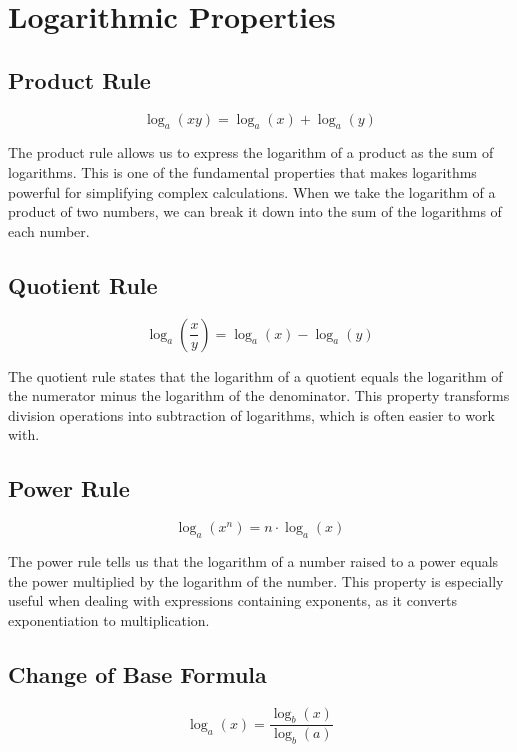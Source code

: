\documentclass{article}
\begin{document}
\section*{Logarithmic Properties}

\subsection*{Product Rule}
\begin{equation}
\log_a(xy) = \log_a(x) + \log_a(y)
\end{equation}

The product rule allows us to express the logarithm of a product as the sum of logarithms. This is one of the fundamental properties that makes logarithms powerful for simplifying complex calculations. When we take the logarithm of a product of two numbers, we can break it down into the sum of the logarithms of each number.

\subsection*{Quotient Rule}
\begin{equation}
\log_a\left(\frac{x}{y}\right) = \log_a(x) - \log_a(y)
\end{equation}

The quotient rule states that the logarithm of a quotient equals the logarithm of the numerator minus the logarithm of the denominator. This property transforms division operations into subtraction of logarithms, which is often easier to work with.

\subsection*{Power Rule}
\begin{equation}
\log_a(x^n) = n \cdot \log_a(x)
\end{equation}

The power rule tells us that the logarithm of a number raised to a power equals the power multiplied by the logarithm of the number. This property is especially useful when dealing with expressions containing exponents, as it converts exponentiation to multiplication.

\subsection*{Change of Base Formula}
\begin{equation}
\log_a(x) = \frac{\log_b(x)}{\log_b(a)}
\end{equation}
\end{document}

